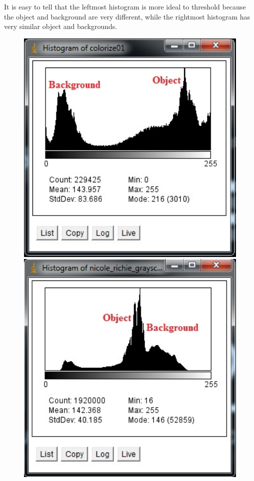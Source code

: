 It is easy to tell that the leftmost histogram is more ideal to threshold because the object and background are very different, while the rightmost histogram has very similar object and backgrounds.

\begin{figure}[htbp] \centering
\begin{minipage}[b]{0.45\textwidth} \centering
\includegraphics[width=1.00\textwidth]{Pictures/Theory/SimpleThresholdPicture} %
\end{minipage} \hfill
\begin{minipage}[b]{0.45\textwidth} \centering
\includegraphics[width=1.00\textwidth]{Pictures/Theory/ComplicatedThresholdPicture} %

\end{minipage}
\end{figure}
